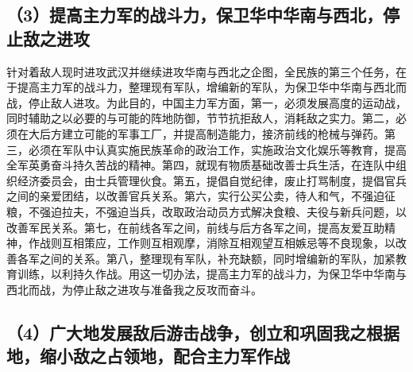 \subsection{（3）提高主力军的战斗力，保卫华中华南与西北，停止敌之进攻}

针对着敌人现时进攻武汉并继续进攻华南与西北之企图，全民族的第三个任务，在于提高主力军的战斗力，整理现有军队，增编新的军队，为保卫华中华南与西北而战，停止敌人进攻。为此目的，中国主力军方面，第一，必须发展高度的运动战，同时辅助之以必要的与可能的阵地防御，节节抗拒敌人，消耗敌之实力。第二，必须在大后方建立可能的军事工厂，并提高制造能力，接济前线的枪械与弹药。第三，必须在军队中认真实施民族革命的政治工作，实施政治文化娱乐等教育，提高全军英勇奋斗持久苦战的精神。第四，就现有物质基础改善士兵生活，在连队中组织经济委员会，由士兵管理伙食。第五，提倡自觉纪律，废止打骂制度，提倡官兵之间的亲爱团结，以改善官兵关系。第六，实行公买公卖，待人和气，不强迫征粮，不强迫拉夫，不强迫当兵，改取政治动员方式解决食粮、夫役与新兵问题，以改善军民关系。第七，在前线各军之间，前线与后方各军之间，提高友爱互助精神，作战则互相策应，工作则互相观摩，消除互相观望互相嫉忌等不良现象，以改善各军之间的关系。第八，整理现有军队，补充缺额，同时增编新的军队，加紧教育训练，以利持久作战。用这一切办法，提高主力军的战斗力，为保卫华中华南与西北而战，为停止敌之进攻与准备我之反攻而奋斗。

\subsection{（4）广大地发展敌后游击战争，创立和巩固我之根据地，缩小敌之占领地，配合主力军作战}

